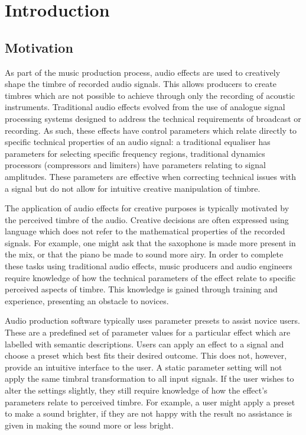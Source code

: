 \chapter{Introduction}
\label{chap:Introduction}

\section{Motivation}
\label{sec:Introduction-Motivation}
	As part of the music production process, audio effects are used to creatively shape the timbre of recorded audio
	signals. This allows producers to create timbres which are not possible to achieve through only the recording of
	acoustic instruments. Traditional audio effects evolved from the use of analogue signal processing systems
	designed to address the technical requirements of broadcast or recording. As such, these effects have control
	parameters which relate directly to specific technical properties of an audio signal: a traditional equaliser has
	parameters for selecting specific frequency regions, traditional dynamics processors (compressors and limiters) have
	parameters relating to signal amplitudes. These parameters are effective when correcting technical issues with a
	signal but do not allow for intuitive creative manipulation of timbre.

	The application of audio effects for creative purposes is typically motivated by the perceived timbre of the audio.
	Creative decisions are often expressed using language which does not refer to the mathematical properties of the
	recorded signals. For example, one might ask that the saxophone is made more present in the mix, or that the piano
	be made to sound more airy. In order to complete these tasks using traditional audio effects, music producers and
	audio engineers require knowledge of how the technical parameters of the effect relate to specific perceived aspects
	of timbre. This knowledge is gained through training and experience, presenting an obstacle to novices.

	Audio production software typically uses parameter presets to assist novice users. These are a predefined set of
	parameter values for a particular effect which are labelled with semantic descriptions. Users can apply an effect to
	a signal and choose a preset which best fits their desired outcome. This does not, however, provide an intuitive
	interface to the user. A static parameter setting will not apply the same timbral transformation to all input
	signals. If the user wishes to alter the settings slightly, they still require knowledge of how the effect's
	parameters relate to perceived timbre. For example, a user might apply a preset to make a sound brighter, if they
	are not happy with the result no assistance is given in making the sound more or less bright.

